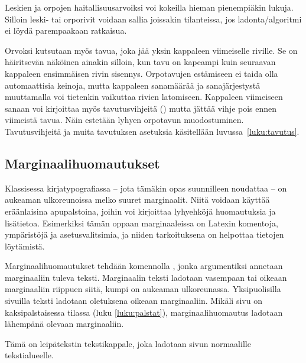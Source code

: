 \begin{koodilohkosis}
\end{koodilohkosis}

Leskien ja orpojen haitallisuusarvoiksi voi kokeilla hieman pienempiäkin
lukuja. Silloin leski- tai orporivit voidaan sallia joissakin
tilanteissa, jos ladonta\-/algoritmi ei löydä parempaakaan ratkaisua.

Orvoksi kutsutaan myös tavua, joka jää yksin kappaleen viimeiselle
riville. Se on häiritsevän näköinen ainakin silloin, kun tavu on
kapeampi kuin seuraavan kappaleen ensimmäisen rivin sisennys.
Orpotavujen estämiseen ei taida olla automaattisia keinoja, mutta
kappaleen sanamäärää ja sanajärjestystä muuttamalla voi tietenkin
vaikuttaa rivien latomiseen. Kappaleen viimeiseen sanaan voi kirjoittaa
myös tavutusvihjeitä (\komento{-}) mutta jättää vihje pois ennen
viimeistä tavua. Näin estetään lyhyen orpotavun muodostuminen.
Tavutusvihjeitä ja muita tavutuksen asetuksia käsitellään
luvussa~\ref{luku:tavutus}.

\subsection{Marginaalihuomautukset}
\label{luku:marginaalihuomautukset}

Klassisessa kirjatypografiassa -- jota tämäkin opas suunnilleen
noudattaa -- on aukeaman ulkoreunoissa melko suuret marginaalit. Niitä
voidaan käyttää eräänlaisina apupalstoina, joihin voi kirjoittaa
lyhyehköjä huomautuksia ja lisätietoa. Esimerkiksi tämän oppaan
marginaaleissa on Latexin komentoja, ympäristöjä ja asetusvalitsimia, ja
niiden tarkoituksena on helpottaa tietojen löytämistä.

Marginaalihuomautukset tehdään komennolla , jonka
argumentiksi annetaan marginaaliin tuleva teksti. Marginaalin teksti
ladotaan vasempaan tai oikeaan marginaaliin riippuen siitä, kumpi on
aukeaman ulkoreunassa. Yksipuolisilla sivuilla teksti ladotaan
oletuksena oikeaan marginaaliin. Mikäli sivu on kaksipalstaisessa
tilassa (luku \ref{luku:palstat}), marginaalihuomautus ladotaan
lähempänä olevaan marginaaliin.

\begin{koodilohkosis}
  Tämä on leipätekstin tekstikappale,
  joka ladotaan sivun normaalille tekstialueelle.
\end{koodilohkosis}

